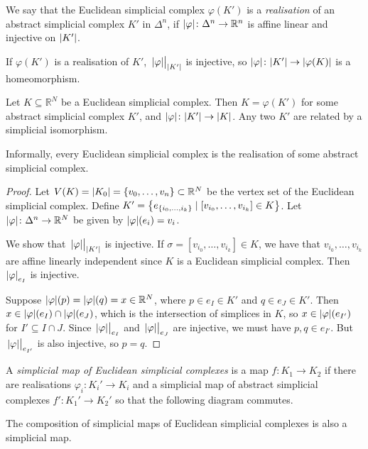 \begin{definition}
	We say that the Euclidean simplicial complex \( \varphi(K') \) is a \emph{realisation} of an abstract simplicial complex \( K' \) in \( \Delta^n \), if \( \abs{\varphi} \colon \Delta^n \to \mathbb R^n \) is affine linear and injective on \( \abs{K'} \).
\end{definition}
\begin{remark}
	If \( \varphi(K') \) is a realisation of \( K' \), \( \eval{\abs{\varphi}}_{\abs{K'}} \) is injective, so \( \abs{\varphi} \colon \abs{K'} \to \abs{\varphi(K)} \) is a homeomorphism.
\end{remark}
\begin{proposition}
	Let \( K \subseteq \mathbb R^N \) be a Euclidean simplicial complex.
	Then \( K = \varphi(K') \) for some abstract simplicial complex \( K' \), and \( \abs{\varphi} \colon \abs{K'} \to \abs{K} \).
	Any two \( K' \) are related by a simplicial isomorphism.
\end{proposition}
Informally, every Euclidean simplicial complex is the realisation of some abstract simplicial complex.
\begin{proof}
	Let \( V(K) = \abs{K_0} = \qty{v_0, \dots, v_n} \subset \mathbb R^N \) be the vertex set of the Euclidean simplicial complex.
	Define \( K' = \qty{e_{\qty{i_0, \dots, i_k}} \mid [v_{i_0}, \dots, v_{i_k}] \in K} \).
	Let \( \abs{\varphi} \colon \Delta^n \to \mathbb R^N \) be given by \( \abs{\varphi}(e_i) = v_i \).

	We show that \( \eval{\abs{\varphi}}_{\abs{K'}} \) is injective.
	If \( \sigma = [v_{i_0}, \dots, v_{i_k}] \in K \), we have that \( v_{i_0}, \dots, v_{i_k} \) are affine linearly independent since \( K \) is a Euclidean simplicial complex.
	Then \( \abs{\varphi}_{e_I} \) is injective.

	Suppose \( \abs{\varphi}(p) = \abs{\varphi}(q) = x \in \mathbb R^N \), where \( p \in e_I \in K' \) and \( q \in e_J \in K' \).
	Then \( x \in \abs{\varphi}(e_I) \cap \abs{\varphi}(e_J) \), which is the intersection of simplices in \( K \), so \( x \in \abs{\varphi}(e_{I'}) \) for \( I' \subseteq I \cap J \).
	Since \( \eval{\abs{\varphi}}_{e_I} \) and \( \eval{\abs{\varphi}}_{e_J} \) are injective, we must have \( p, q \in e_{I'} \).
	But \( \eval{\abs{\varphi}}_{e_{I'}} \) is also injective, so \( p = q \).
\end{proof}
\begin{definition}
	A \emph{simplicial map of Euclidean simplicial complexes} is a map \( f \colon K_1 \to K_2 \) if there are realisations \( \varphi_i \colon K_i' \to K_i \) and a simplicial map of abstract simplicial complexes \( f' \colon K_1' \to K_2' \) so that the following diagram commutes.
\end{definition}
\begin{remark}
	The composition of simplicial maps of Euclidean simplicial complexes is also a simplicial map.
\end{remark}

